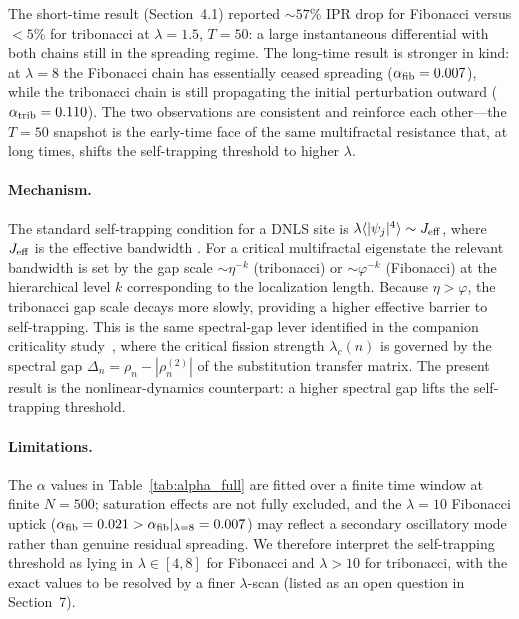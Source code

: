 \documentclass[12pt,a4paper]{article}
\begin{document}
The short-time result (Section~4.1) reported $\sim\!57\%$ IPR drop for
Fibonacci versus $<\!5\%$ for tribonacci at $\lambda=1.5$, $T=50$: a
large instantaneous differential with both chains still in the spreading
regime. The long-time result is stronger in kind: at $\lambda = 8$ the
Fibonacci chain has essentially ceased spreading
($\alpha_{\rm fib} = 0.007$), while the tribonacci chain is still
propagating the initial perturbation outward
($\alpha_{\rm trib} = 0.110$). The two observations are consistent and
reinforce each other---the $T=50$ snapshot is the early-time face of the
same multifractal resistance that, at long times, shifts the self-trapping
threshold to higher $\lambda$.

\paragraph{Mechanism.}
The standard self-trapping condition for a DNLS site is
$\lambda \langle |\psi_j|^4 \rangle \sim J_{\rm eff}$, where $J_{\rm eff}$
is the effective bandwidth \cite{Eilbeck1985,Kevrekidis2009}.
For a critical multifractal eigenstate the relevant bandwidth is set by
the gap scale $\sim \eta^{-k}$ (tribonacci) or $\sim \varphi^{-k}$
(Fibonacci) at the hierarchical level $k$ corresponding to the
localization length. Because $\eta > \varphi$, the tribonacci gap scale
decays more slowly, providing a higher effective barrier to self-trapping.
This is the same spectral-gap lever identified in the companion criticality
study~\cite{Grossi2026Criticality}, where the critical fission strength
$\lambda_c(n)$ is governed by the spectral gap $\Delta_n = \rho_n -
|\rho_n^{(2)}|$ of the substitution transfer matrix. The present result is
the nonlinear-dynamics counterpart: a higher spectral gap lifts the
self-trapping threshold.

\paragraph{Limitations.}
The $\alpha$ values in Table~\ref{tab:alpha_full} are fitted over a finite
time window at finite $N=500$; saturation effects are not fully excluded,
and the $\lambda=10$ Fibonacci uptick ($\alpha_{\rm fib} = 0.021 >
\alpha_{\rm fib}|_{\lambda=8} = 0.007$) may reflect a secondary oscillatory
mode rather than genuine residual spreading. We therefore interpret the
self-trapping threshold as lying in $\lambda \in [4, 8]$ for Fibonacci and
$\lambda > 10$ for tribonacci, with the exact values to be resolved by
a finer $\lambda$-scan (listed as an open question in Section~7).
\end{document}
